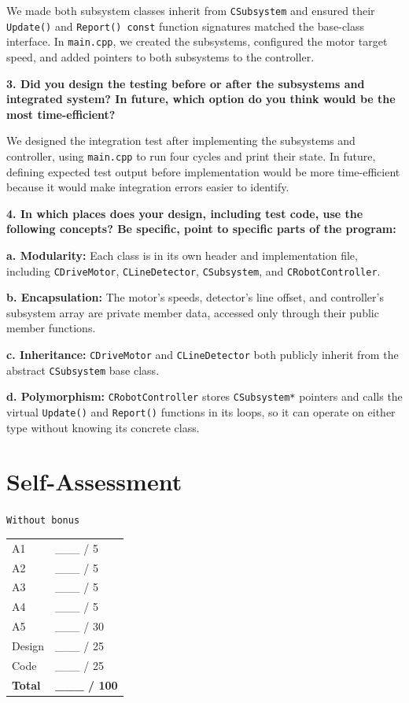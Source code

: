 \documentclass[10pt,a4paper]{article}
\newcommand{\question}[1]{%
    \vspace{5pt}
    \textbf{#1}\par
    \vspace{2pt}
}
\begin{document}
We made both subsystem classes inherit from \texttt{CSubsystem} and ensured
their \texttt{Update()} and \texttt{Report() const} function signatures
matched the base-class interface. In \texttt{main.cpp}, we created the
subsystems, configured the motor target speed, and added pointers to both
subsystems to the controller.

\question{3. Did you design the testing before or after the subsystems and integrated system? In future, which option do you think would be the most time-efficient?}

We designed the integration test after implementing the subsystems and
controller, using \texttt{main.cpp} to run four cycles and print their state.
In future, defining expected test output before implementation would be more
time-efficient because it would make integration errors easier to identify.

\question{4. In which places does your design, including test code, use the following concepts? Be specific, point to specific parts of the program:}

\textbf{a. Modularity:} Each class is in its own header and implementation
file, including \texttt{CDriveMotor}, \texttt{CLineDetector},
\texttt{CSubsystem}, and \texttt{CRobotController}.

\textbf{b. Encapsulation:} The motor's speeds, detector's line offset, and
controller's subsystem array are private member data, accessed only through
their public member functions.

\textbf{c. Inheritance:} \texttt{CDriveMotor} and \texttt{CLineDetector}
both publicly inherit from the abstract \texttt{CSubsystem} base class.

\textbf{d. Polymorphism:} \texttt{CRobotController} stores
\texttt{CSubsystem*} pointers and calls the virtual \texttt{Update()} and
\texttt{Report()} functions in its loops, so it can operate on either type
without knowing its concrete class.

\newpage
\section{Self-Assessment}

\texttt{Without bonus}

\begin{center}
\begin{tabular}{ll}
A1 & \_\_\_ / 5 \\
A2 & \_\_\_ / 5 \\
A3 & \_\_\_ / 5 \\
A4 & \_\_\_ / 5 \\
A5 & \_\_\_ / 30 \\
Design & \_\_\_ / 25 \\
Code & \_\_\_ / 25 \\
\textbf{Total} & \textbf{\_\_\_ / 100} \\
\end{tabular}
\end{center}
\end{document}
